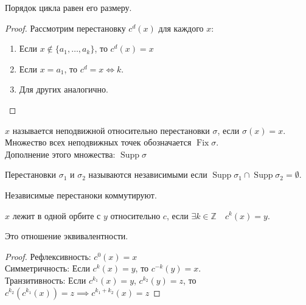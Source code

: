 \documentclass[11pt, oneside]{article}   	%
\DeclareMathOperator{\fix}{Fix}
\DeclareMathOperator{\supp}{Supp}
\begin{document}
    \begin{theorem}
        Порядок цикла равен его размеру.
        \begin{proof}
            Рассмотрим перестановку $c^{d}(x)$ для каждого $x$:
            \begin{enumerate}
                \item Если $x \not\in \{a_1, \ldots, a_k\} $, то $c^{d}(x)=x$ 
                \item Если $x=a_1$, то $c^{d} = x \iff k$.
                \item Для других аналогично.
            \end{enumerate}
        \end{proof}
    \end{theorem}
    \begin{definition}
        $x$  называется неподвижной относительно перестановки $\sigma$, если $\sigma(x) = x$.\\
        Множество всех неподвижных точек обозначается $\fix\sigma$.\\
        Дополнение этого множества: $\supp\sigma$
    \end{definition}
    \begin{definition}
        Перестановки $\sigma_1$ и $\sigma_2$ называются независимыми если $\supp \sigma_1\cap \supp \sigma_2 = \emptyset$.
    \end{definition}
    \begin{dlemma}
        Независимые перестаноки коммутируют.
    \end{dlemma}
    \begin{definition}
        $x$ лежит в одной орбите с $y$ относительно $c$, если $\exists{k\in \mathbb{Z}}\quad c^{k}(x) = y$.
    \end{definition}
    \begin{dlemma}
        Это отношение эквивалентности.\\
        \begin{proof}
            Рефлексивность: $c^{0}(x) = x$\\
            Симметричность: Если $c^{k}(x) = y$, то $c^{-k}(y) = x$.\\
            Транзитивность: Если $c^{k_1}(x) = y$, $c^{k_2}(y) = z$, то $c^{k_2}(c^{k_1}(x)) = z \implies c^{k_1+k_2}(x) = z$  
        \end{proof}
    \end{dlemma}
\end{document}
